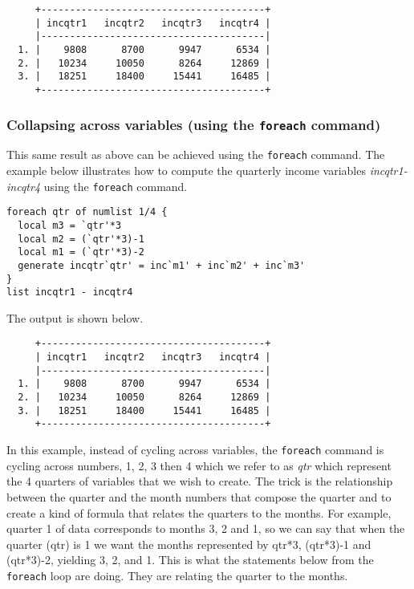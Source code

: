 \begin{lstlisting}
     +---------------------------------------+
     | incqtr1   incqtr2   incqtr3   incqtr4 |
     |---------------------------------------|
  1. |    9808      8700      9947      6534 |
  2. |   10234     10050      8264     12869 |
  3. |   18251     18400     15441     16485 |
     +---------------------------------------+
\end{lstlisting}

\subsubsection{Collapsing across variables (using the \lstinline{foreach} command)}
This same result as above can be achieved using the \lstinline{foreach} command. The example below illustrates how to compute the quarterly income variables \textit{incqtr1-incqtr4} using the \lstinline{foreach} command.

\begin{lstlisting}
foreach qtr of numlist 1/4 {
  local m3 = `qtr'*3
  local m2 = (`qtr'*3)-1
  local m1 = (`qtr'*3)-2
  generate incqtr`qtr' = inc`m1' + inc`m2' + inc`m3'
}
list incqtr1 - incqtr4
\end{lstlisting}

The output is shown below.

\begin{lstlisting}
     +---------------------------------------+
     | incqtr1   incqtr2   incqtr3   incqtr4 |
     |---------------------------------------|
  1. |    9808      8700      9947      6534 |
  2. |   10234     10050      8264     12869 |
  3. |   18251     18400     15441     16485 |
     +---------------------------------------+
\end{lstlisting}

In this example, instead of cycling across variables, the \lstinline{foreach} command is cycling across numbers, 1, 2, 3 then 4 which we refer to as \textit{qtr} which represent the 4 quarters of variables that we wish to create.  The trick is the relationship between the quarter and the month numbers that compose the quarter and to create a kind of formula that relates the quarters to the months.  For example, quarter 1 of data corresponds to months 3, 2 and 1, so we can say that when the quarter (qtr) is 1 we want the months represented by qtr*3, (qtr*3)-1 and (qtr*3)-2, yielding 3, 2, and 1.  This is what the statements below from the \lstinline{foreach} loop are doing.  They are relating the quarter to the months.


